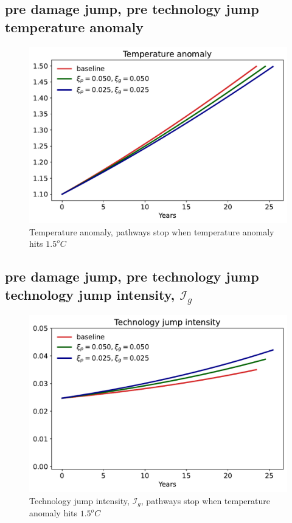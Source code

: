 \documentclass[11pt]{article}
\begin{document}
\subsection{pre damage jump, pre technology jump temperature anomaly}
\begin{figure}[H]
	\centering
	\includegraphics[width=\textwidth]{../figures/20damage/Yt_1p5.pdf}
	\caption{Temperature anomaly, pathways stop when temperature anomaly hits $1.5^o C$}
\end{figure}

\subsection{pre damage jump, pre technology jump technology jump intensity, $\mathcal{I}_g$}
\begin{figure}[H]
	\centering
	\includegraphics[width=\textwidth]{../figures/20damage/Lt_1p5.pdf}
	\caption{Technology jump intensity, $\mathcal{I}_g$, pathways stop when temperature anomaly hits $1.5^o C$}
\end{figure}
\end{document}
